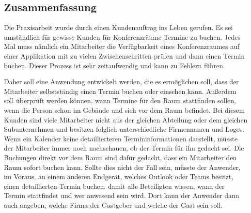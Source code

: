 
\subsection{Zusammenfassung}
Die Praxisarbeit wurde durch einen Kundenauftrag ins Leben gerufen.
Es sei umständlich für gewisse Kunden für Konferenzräume Termine zu buchen.
Jedes Mal muss nämlich ein Mitarbeiter die Verfügbarkeit eines Konferenzraumes auf einer Applikation mit zu vielen Zwischenschritten prüfen und dann einen Termin buchen.
Dieser Prozess ist sehr zeitaufwendig und kann zu Fehlern führen.

\newline
\newline
Daher soll eine Anwendung entwickelt werden, die es ermöglichen soll, dass der Mitarbeiter selbstständig einen Termin buchen oder einsehen kann.
Außerdem soll überprüft werden können, wann Termine für den Raum stattfinden sollen, wenn die Person schon im Gebäude und sich vor dem Raum befindet.
\newline
Bei diesem Kunden sind viele Mitarbeiter nicht aus der gleichen Abteilung oder dem gleichen Subunternehmen und besitzen folglich unterschiedliche Firmennamen und Logos.
Wenn ein Kalender keine detaillierteren Termininformationen darstellt, müsste der Mitarbeiter immer noch nachschauen, ob der Termin für ihn gedacht sei.
Die Buchungen direkt vor dem Raum sind dafür gedacht, dass ein Mitarbeiter den Raum sofort buchen kann.
\newline
Sollte dies nicht der Fall sein, müsste der Anwender, im Voraus, an einem anderen Endgerät, welches Outlook oder Teams besitzt, einen detaillierten Termin buchen, damit alle Beteiligten wissen, wann der Termin stattfindet und wer anwesend sein wird.
Dort kann der Anwender dann auch angeben, welche Firma der Gastgeber und welche der Gast sein soll.
